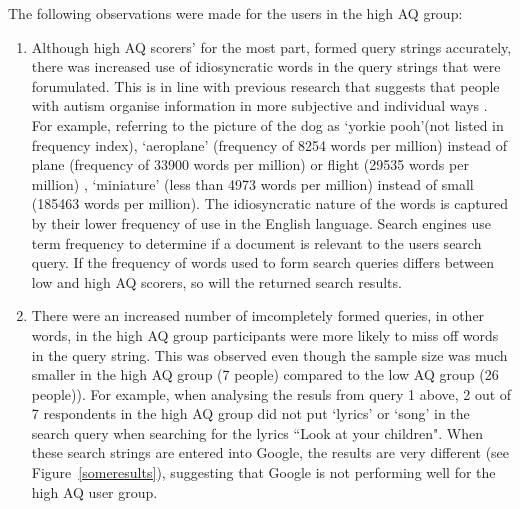 \documentclass[a4paper, 11pt]{article}
\begin{document}
The following observations were made for the users in the high AQ group:
\begin{enumerate}
\item{Although high AQ scorers' for the most part, formed query strings accurately, there was increased use of idiosyncratic words in the query strings that were forumulated. This is in line with previous research that suggests that people with autism organise information in more subjective and individual ways \cite{subjective organisation}. For example, referring to the picture of the dog as `yorkie pooh'(not listed in frequency index), `aeroplane' (frequency of 8254 words per million) instead of plane (frequency of 33900 words per million) or flight (29535 words per million) , `miniature' (less than 4973 words per million) instead of small (185463 words per million). The idiosyncratic nature of the words is captured by their lower frequency of use in the English language. Search engines use term frequency to determine if a document is relevant to the users search query. If the frequency of words used to form search queries differs between low and high AQ scorers, so will the returned search results.}

\item{There were an increased number of imcompletely formed queries, in other words, in the high AQ group participants were more likely to miss off words in the query string. This was observed even though the sample size was much smaller in the high AQ group (7 people) compared to the low AQ group (26 people)). For example, when analysing the resuls from query 1 above, 2 out of 7 respondents in the high AQ group did not put `lyrics' or `song' in the search query when searching for the lyrics ``Look at your children". When these search strings are entered into Google, the results are very different (see Figure~\ref{someresults}), suggesting that Google is not performing well for the high AQ user group.

}
\end{enumerate}
\end{document}
